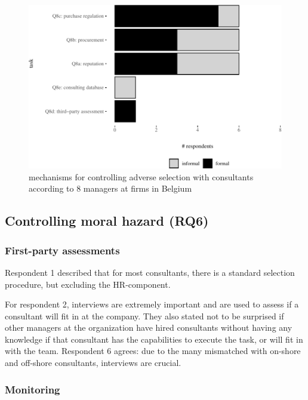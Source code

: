 \documentclass[
  man,floatsintext]{apa6}
\begin{document}
\begin{figure}

{\centering \includegraphics[width=0.75\linewidth]{2_ams_five_pager_files/figure-latex/unnamed-chunk-7-1} 

}

\caption{mechanisms for controlling adverse selection with consultants according to 8 managers at firms in Belgium}\label{fig:unnamed-chunk-7}
\end{figure}

\subsection{Controlling moral hazard (RQ6)}\label{controlling-moral-hazard-rq6}

\subsubsection{First-party assessments}\label{first-party-assessments-1}

Respondent 1 described that for most consultants, there is a standard selection procedure, but excluding the HR-component.

For respondent 2, interviews are extremely important and are used to assess if a consultant will fit in at the company. They also stated not to be surprised if other managers at the organization have hired consultants without having any knowledge if that consultant has the capabilities to execute the task, or will fit in with the team. Respondent 6 agrees: due to the many mismatched with on-shore and off-shore consultants, interviews are crucial.

\subsubsection{Monitoring}\label{monitoring-1}
\end{document}
